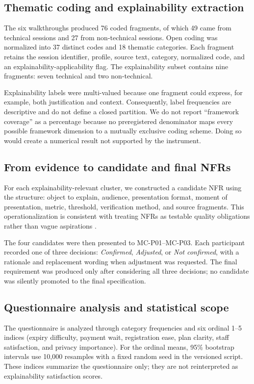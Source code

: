 \documentclass[pdflatex,sn-basic]{sn-jnl}
\begin{document}
\subsection{Thematic coding and explainability extraction}
The six walkthroughs produced 76 coded fragments, of which 49 came from technical sessions and 27 from non-technical sessions. Open coding was normalized into 37 distinct codes and 18 thematic categories. Each fragment retains the session identifier, profile, source text, category, normalized code, and an explainability-applicability flag. The explainability subset contains nine fragments: seven technical and two non-technical.

Explainability labels were multi-valued because one fragment could express, for example, both justification and context. Consequently, label frequencies are descriptive and do not define a closed partition. We do not report ``framework coverage'' as a percentage because no preregistered denominator maps every possible framework dimension to a mutually exclusive coding scheme. Doing so would create a numerical result not supported by the instrument.

\subsection{From evidence to candidate and final NFRs}
For each explainability-relevant cluster, we constructed a candidate NFR using the structure: object to explain, audience, presentation format, moment of presentation, metric, threshold, verification method, and source fragments. This operationalization is consistent with treating NFRs as testable quality obligations rather than vague aspirations \cite{glinz2007,chazette2020,chazette2021}.

The four candidates were then presented to MC-P01--MC-P03. Each participant recorded one of three decisions: \emph{Confirmed}, \emph{Adjusted}, or \emph{Not confirmed}, with a rationale and replacement wording when adjustment was requested. The final requirement was produced only after considering all three decisions; no candidate was silently promoted to the final specification.

\subsection{Questionnaire analysis and statistical scope}
The questionnaire is analyzed through category frequencies and six ordinal 1--5 indices (expiry difficulty, payment wait, registration ease, plan clarity, staff satisfaction, and privacy importance). For the ordinal means, 95\% bootstrap intervals use 10,000 resamples with a fixed random seed in the versioned script. These indices summarize the questionnaire only; they are not reinterpreted as explainability satisfaction scores.
\end{document}
